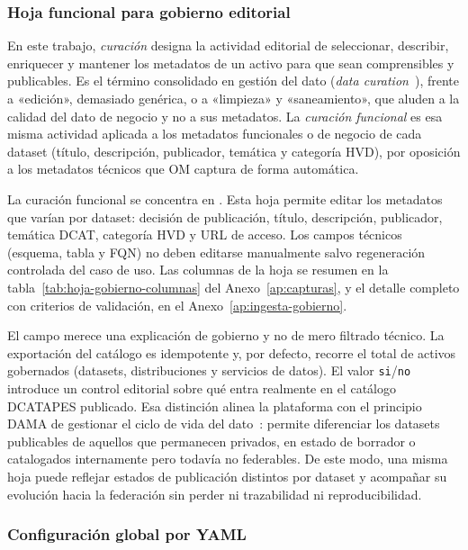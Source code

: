 \subsubsection{Hoja funcional para gobierno editorial}

En este trabajo, \emph{curación} designa la actividad editorial de seleccionar, describir, enriquecer y mantener los metadatos de un activo para que sean comprensibles y publicables. Es el término consolidado en gestión del dato (\emph{data curation}~\cite{damaDmbok}), frente a «edición», demasiado genérica, o a «limpieza» y «saneamiento», que aluden a la calidad del dato de negocio y no a sus metadatos. La \emph{curación funcional} es esa misma actividad aplicada a los metadatos funcionales o de negocio de cada dataset (título, descripción, publicador, temática y categoría \ac{HVD}), por oposición a los metadatos técnicos que \ac{OM} captura de forma automática.

La curación funcional se concentra en . Esta hoja permite editar los metadatos que varían por dataset: decisión de publicación, título, descripción, publicador, temática DCAT, categoría HVD y URL de acceso. Los campos técnicos (esquema, tabla y \ac{FQN}) no deben editarse manualmente salvo regeneración controlada del caso de uso. Las columnas de la hoja se resumen en la tabla~\ref{tab:hoja-gobierno-columnas} del Anexo~\ref{ap:capturas}, y el detalle completo con criterios de validación, en el Anexo~\ref{ap:ingesta-gobierno}.

El campo  merece una explicación de gobierno y no de mero filtrado técnico. La exportación del catálogo es idempotente y, por defecto, recorre el total de activos gobernados (datasets, distribuciones y servicios de datos). El valor \texttt{si}/\texttt{no} introduce un control editorial sobre qué entra realmente en el catálogo \ac{DCATAPES} publicado. Esa distinción alinea la plataforma con el principio \ac{DAMA} de gestionar el ciclo de vida del dato~\cite{damaDmbok}: permite diferenciar los datasets publicables de aquellos que permanecen privados, en estado de borrador o catalogados internamente pero todavía no federables. De este modo, una misma hoja puede reflejar estados de publicación distintos por dataset y acompañar su evolución hacia la federación sin perder ni trazabilidad ni reproducibilidad.

\subsubsection{Configuración global por YAML}


